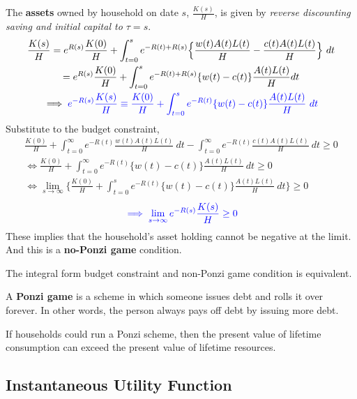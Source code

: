 \documentclass[11pt]{article}
\begin{document}
	The \textbf{assets} owned by household on date $s$, $\frac{K(s)}{H}$, is given by \emph{reverse discounting saving and initial capital to $\tau=s$}.
	\begin{gather}
		\frac{K(s)}{H} = e^{R(s)} \frac{K(0)}{H} + \int_{t=0}^s e^{-R(t)+R(s)} \Big\{\frac{w(t)A(t)L(t)}{H} - \frac{c(t)A(t)L(t)}{H} \Big\}\ dt \\
		= e^{R(s)} \frac{K(0)}{H} +  \int_{t=0}^s e^{-R(t)+R(s)} \{w(t) - c(t)\} \frac{A(t)L(t)}{H} dt \\
		\implies \textcolor{blue}{
		e^{-R(s)} \frac{K(s)}{H} \equiv \frac{K(0)}{H} + \int_{t=0}^s e^{-R(t)} \{w(t) - c(t)\} \frac{A(t)L(t)}{H}\ dt}
	\end{gather}
	Substitute to the budget constraint,
	\begin{gather}
		\frac{K(0)}{H} + \int_{t=0}^\infty e^{-R(t)} \frac{w(t)A(t)L(t)}{H}\ dt - \int_{t=0}^\infty e^{-R(t)} \frac{c(t)A(t)L(t)}{H}\ dt \geq 0 \\
		\iff \frac{K(0)}{H} + \int_{t=0}^\infty e^{-R(t)} \{w(t) - c(t)\} \frac{A(t)L(t)}{H}\ dt \geq 0 \\
		\iff \lim_{s \to \infty}\Big\{ \frac{K(0)}{H} + \int_{t=0}^s e^{-R(t)} \{w(t) - c(t)\} \frac{A(t)L(t)}{H}\ dt \Big \} \geq 0 
	\end{gather}
	\begin{equation}
		\textcolor{blue}{
			\implies \lim_{s\to \infty}e^{-R(s)}\frac{K(s)}{H} \geq 0
		}
	\end{equation}
	These implies that the household's asset holding cannot be negative at the limit. And this is a \textbf{no-Ponzi game} condition.
	
	\begin{proposition}
		The integral form budget constraint and non-Ponzi game condition is equivalent.
	\end{proposition}
	
	\begin{definition}
		A \textbf{Ponzi game} is a scheme in which someone issues debt and rolls it over forever. In other words, the person always pays off debt by issuing more debt.
	\end{definition}
	
	\begin{remark}
		If households could run a Ponzi scheme, then the present value of lifetime consumption can exceed the present value of lifetime resources.
	\end{remark}
	
	\subsection{Instantaneous Utility Function}
	
\end{document}
